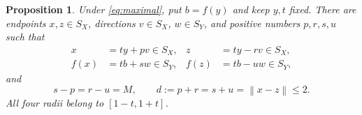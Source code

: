 \documentclass[11pt]{article}
\newtheorem{proposition}[theorem]{Proposition}
\theoremstyle{remark}
\newcommand{\norm}[1]{\left\lVert#1\right\rVert}
\begin{document}
\begin{samepage}
\begin{proposition}\label{prop:alignment}
Under \eqref{eq:maximal}, put $b=f(y)$ and keep $y,t$ fixed. There are endpoints $x,z\in S_X$, directions $v\in S_X$, $w\in S_Y$, and positive numbers $p,r,s,u$ such that
\begin{equation}\label{eq:chords}
\begin{aligned}
x&=ty+pv\in S_X,& z&=ty-rv\in S_X,\\
f(x)&=tb+sw\in S_Y,& f(z)&=tb-uw\in S_Y,
\end{aligned}
\end{equation}
and
\begin{equation}\label{eq:radii}
s-p=r-u=M,\qquad d:=p+r=s+u=\norm{x-z}\le2.
\end{equation}
All four radii belong to $[1-t,1+t]$.
\end{proposition}
\end{samepage}
\end{document}
